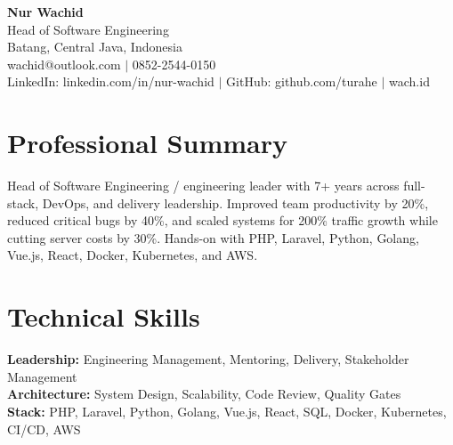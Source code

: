 \begin{center}
  {\LARGE\bfseries Nur Wachid}\\[3pt]
  Head of Software Engineering\\[2pt]
  Batang, Central Java, Indonesia\\[2pt]
  wachid@outlook.com $|$ 0852-2544-0150\\[1pt]
  LinkedIn: linkedin.com/in/nur-wachid $|$ GitHub: github.com/turahe $|$ wach.id
\end{center}
\section*{Professional Summary}
Head of Software Engineering / engineering leader with 7+ years across full-stack, DevOps, and delivery leadership. Improved team productivity by 20\%, reduced critical bugs by 40\%, and scaled systems for 200\% traffic growth while cutting server costs by 30\%. Hands-on with PHP, Laravel, Python, Golang, Vue.js, React, Docker, Kubernetes, and AWS.
\section*{Technical Skills}
\textbf{Leadership:} Engineering Management, Mentoring, Delivery, Stakeholder Management\\[1pt]
\textbf{Architecture:} System Design, Scalability, Code Review, Quality Gates\\[1pt]
\textbf{Stack:} PHP, Laravel, Python, Golang, Vue.js, React, SQL, Docker, Kubernetes, CI/CD, AWS
